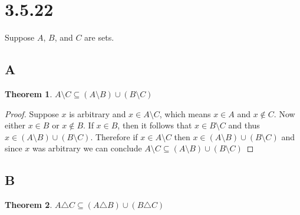 \documentclass{article}
\newtheorem*{theorem}{Theorem}  %
\begin{document}
\section*{3.5.22}
Suppose $A$, $B$, and $C$ are sets.

\subsection*{A}
\begin{theorem} $A \setminus C \subseteq (A \setminus B) \cup (B \setminus C)$
\end{theorem}

\begin{proof}
Suppose $x$ is arbitrary and $x \in A \setminus C$, which means $x \in A$ and $x \notin C$. Now either $x \in B$ or $x \notin B$. If $x \in B$, then it follows that $x \in B \setminus C$ and thus $x \in (A \setminus B) \cup (B \setminus C)$. Therefore if $x \in A \setminus C$ then $x \in (A \setminus B) \cup (B \setminus C)$ and since $x$ was arbitrary we can conclude $A \setminus C \subseteq (A \setminus B) \cup (B \setminus C)$
\end{proof}

\subsection*{B}

\begin{theorem} $A \triangle C \subseteq (A \triangle B) \cup (B \triangle C)$
\end{theorem}
\end{document}
